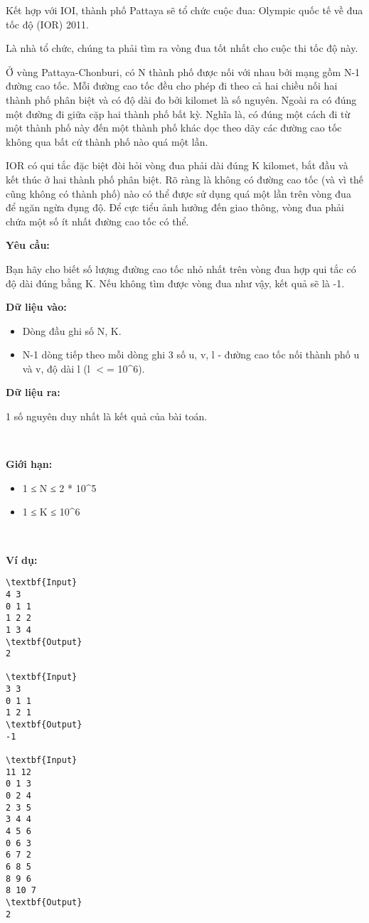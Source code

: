 

Kết hợp với IOI, thành phố Pattaya sẽ tổ chức cuộc đua: Olympic quốc tế về đua tốc độ (IOR) 2011.

Là nhà tổ chức, chúng ta phải tìm ra vòng đua tốt nhất cho cuộc thi tốc độ này.

Ở vùng Pattaya-Chonburi, có N thành phố được nối với nhau bởi mạng gồm N-1 đường cao tốc. Mỗi đường cao tốc đều cho phép đi theo cả hai chiều nối hai thành phố phân biệt và có độ dài đo bởi kilomet là số nguyên. Ngoài ra có đúng một đường đi giữa cặp hai thành phố bất kỳ. Nghĩa là, có đúng một cách đi từ một thành phố này đến một thành phố khác dọc theo dãy các đường cao tốc không qua bất cứ thành phố nào quá một lần.

IOR có qui tắc đặc biệt đòi hỏi vòng đua phải dài đúng K kilomet, bắt đầu và kết thúc ở hai thành phố phân biệt. Rõ ràng là không có đường cao tốc (và vì thế cũng không có thành phố) nào có thể được sử dụng quá một lần trên vòng đua để ngăn ngừa đụng độ. Để cực tiểu ảnh hưởng đến giao thông, vòng đua phải chứa một số ít nhất đường cao tốc có thể.

\textbf{Yêu cầu: }

Bạn hãy cho biết số lượng đường cao tốc nhỏ nhất trên vòng đua hợp qui tắc có độ dài đúng bằng K. Nếu không tìm được vòng đua như vậy, kết quả sẽ là -1.

\textbf{Dữ liệu vào: }
\begin{itemize}
	\item Dòng đầu ghi số N, K.
	\item N-1 dòng tiếp theo mỗi dòng ghi 3 số u, v, l - đường cao tốc nối thành phố u và v, độ dài l (l $<$= 10\textasciicircum6).
\end{itemize}

\textbf{Dữ liệu ra: }

1 số nguyên duy nhất là kết quả của bài toán.

 

\textbf{Giới hạn: }
\begin{itemize}
	\item 1 ≤ N ≤ 2 * 10\textasciicircum5
	\item 1 ≤ K ≤ 10\textasciicircum6
\end{itemize}

 

\textbf{Ví dụ: }
\begin{verbatim}
\textbf{Input}
4 3
0 1 1
1 2 2
1 3 4
\textbf{Output}
2

\textbf{Input}
3 3
0 1 1
1 2 1
\textbf{Output}
-1

\textbf{Input}
11 12
0 1 3
0 2 4
2 3 5
3 4 4
4 5 6
0 6 3
6 7 2
6 8 5
8 9 6
8 10 7
\textbf{Output}
2\end{verbatim}

 
